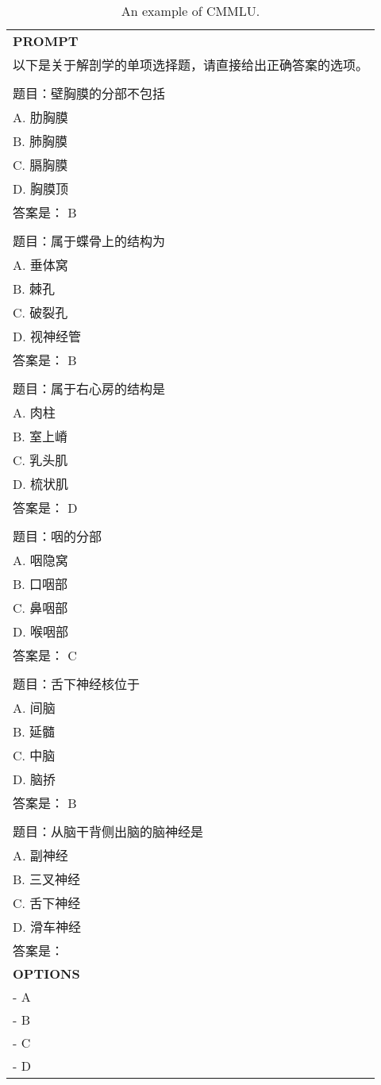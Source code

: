 \begin{table}[ht]
    \centering \small
\begin{tabular}{p{12cm}}
\toprule
\textbf{PROMPT}\\
以下是关于解剖学的单项选择题，请直接给出正确答案的选项。
\\
\\题目：壁胸膜的分部不包括
\\A. 肋胸膜
\\B. 肺胸膜
\\C. 膈胸膜
\\D. 胸膜顶
\\答案是： B
\\
\\题目：属于蝶骨上的结构为
\\A. 垂体窝
\\B. 棘孔
\\C. 破裂孔
\\D. 视神经管
\\答案是： B
\\
\\题目：属于右心房的结构是
\\A. 肉柱
\\B. 室上嵴
\\C. 乳头肌
\\D. 梳状肌
\\答案是： D
\\
\\题目：咽的分部
\\A. 咽隐窝
\\B. 口咽部
\\C. 鼻咽部
\\D. 喉咽部
\\答案是： C
\\
\\题目：舌下神经核位于
\\A. 间脑
\\B. 延髓
\\C. 中脑
\\D. 脑挢
\\答案是： B
\\
\\题目：从脑干背侧出脑的脑神经是
\\A. 副神经
\\B. 三叉神经
\\C. 舌下神经
\\D. 滑车神经
\\答案是：\\
\midrule
\textbf{OPTIONS}\\
- A\\
- B\\
- C\\
- D\\
\bottomrule
\end{tabular}
    \caption{\centering An example of CMMLU.}
    \label{tab:cmmlu_eval_format_example}
\end{table}

